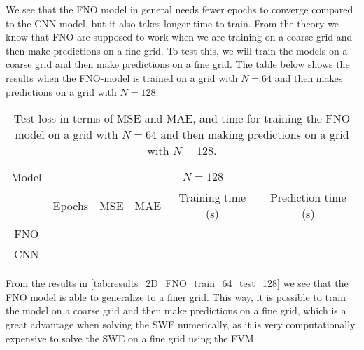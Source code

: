 We see that the FNO model in general needs fewer epochs to converge compared to the CNN model, but it also takes longer time to train.
From the theory we know that FNO are supposed to work when we are training on a coarse grid and then make predictions on a fine grid.
To test this, we will train the models on a coarse grid and then make predictions on a fine grid.
The table below shows the results when the FNO-model is trained on a grid with $N = 64$ and then makes predictions on a grid with $N = 128$.
\begin{table}[H]
    \centering
    \begin{tabular}{c|ccccc}
        Model & \multicolumn{5}{c}{$N = 128$} \\
        \cline{2-6}
        & Epochs & MSE & MAE & Training time (s) & Prediction time (s) \\
        \hline
        FNO  &
         &
         &
         &
         &
         \\
        CNN &
         &
         &
         &
         &
        
    \end{tabular}
    \caption{Test loss in terms of MSE and MAE, and time for training the FNO model on a grid with $N = 64$ and then making predictions on a grid with $N = 128$.}\label{tab:results_2D_FNO_train_64_test_128}
\end{table}
From the results in \autoref{tab:results_2D_FNO_train_64_test_128} we see that the FNO model is able to generalize to a finer grid.
This way, it is possible to train the model on a coarse grid and then make predictions on a fine grid, which is a great advantage when solving the SWE numerically, as it is very computationally expensive to solve the SWE on a fine grid using the FVM.

